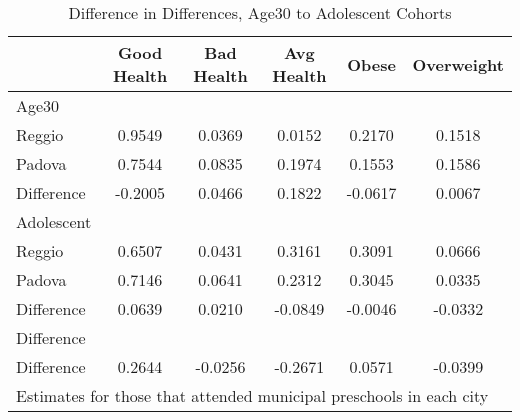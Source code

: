 \begin{table}[htbp]\centering
\caption{Difference in Differences, Age30 to Adolescent Cohorts}
\begin{tabular}{l*{5}{c}}
\hline\hline
            & Good Health&  Bad Health&  Avg Health&       Obese&  Overweight\\
\hline
Age30       &            &            &            &            &            \\
Reggio      &      0.9549&      0.0369&      0.0152&      0.2170&      0.1518\\
Padova      &      0.7544&      0.0835&      0.1974&      0.1553&      0.1586\\
Difference  &     -0.2005&      0.0466&      0.1822&     -0.0617&      0.0067\\
\hline
Adolescent  &            &            &            &            &            \\
Reggio      &      0.6507&      0.0431&      0.3161&      0.3091&      0.0666\\
Padova      &      0.7146&      0.0641&      0.2312&      0.3045&      0.0335\\
Difference  &      0.0639&      0.0210&     -0.0849&     -0.0046&     -0.0332\\
\hline
Difference  &            &            &            &            &            \\
Difference  &      0.2644&     -0.0256&     -0.2671&      0.0571&     -0.0399\\
\hline\hline
\multicolumn{6}{l}{\footnotesize Estimates for those that attended municipal preschools in each city}\\
\end{tabular}
\end{table}
